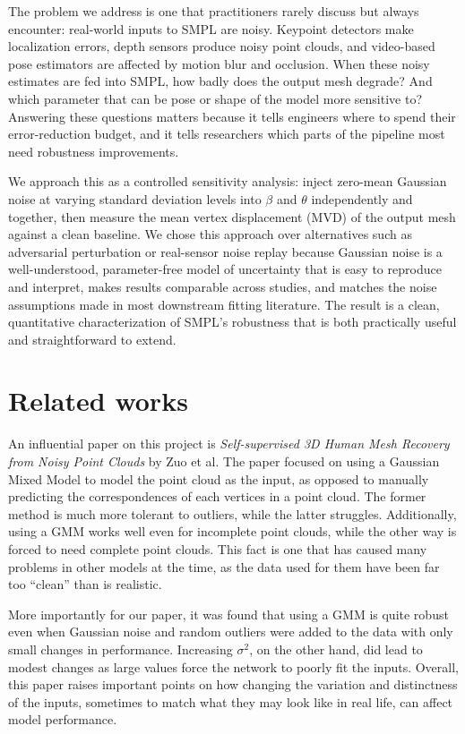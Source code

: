 \documentclass[final]{article}
\begin{document}
The problem we address is one that practitioners rarely discuss but always 
encounter: real-world inputs to SMPL are noisy. Keypoint detectors make 
localization errors, depth sensors produce noisy point clouds, and video-based 
pose estimators are affected by motion blur and occlusion. When these noisy 
estimates are fed into SMPL, how badly does the output mesh degrade? And which 
parameter that can be pose or shape of the model more sensitive to? Answering these 
questions matters because it tells engineers where to spend their 
error-reduction budget, and it tells researchers which parts of the pipeline 
most need robustness improvements.

We approach this as a controlled sensitivity analysis: inject zero-mean Gaussian 
noise at varying standard deviation levels into $\beta$ and $\theta$ 
independently and together, then measure the mean vertex displacement (MVD) of 
the output mesh against a clean baseline. We chose this approach over 
alternatives such as adversarial perturbation or real-sensor noise replay 
because Gaussian noise is a well-understood, parameter-free model of uncertainty 
that is easy to reproduce and interpret, makes results comparable across 
studies, and matches the noise assumptions made in most downstream fitting 
literature. The result is a clean, quantitative characterization of SMPL's 
robustness that is both practically useful and straightforward to extend.


\section{Related works}\label{sec:past}

An influential paper on this project is \textit{Self-supervised 3D Human Mesh Recovery from Noisy Point Clouds} by Zuo et al. \cite{ZuoWSGC21} The paper focused on using a Gaussian Mixed Model to model the point cloud as the input, as opposed to manually predicting the correspondences of each vertices in a point cloud. The former method is much more tolerant to outliers, while the latter struggles. Additionally, using a GMM works well even for incomplete point clouds, while the other way is forced to need complete point clouds. This fact is one that has caused many problems in other models at the time, as the data used for them have been far too “clean” than is realistic.

More importantly for our paper, it was found that using a GMM is quite robust even when Gaussian noise and random outliers were added to the data with only small changes in performance. Increasing $\sigma^2$, on the other hand, did lead to modest changes as large values force the network to poorly fit the inputs. Overall, this paper raises important points on how changing the variation and distinctness of the inputs, sometimes to match what they may look like in real life, can affect model performance.
\end{document}
